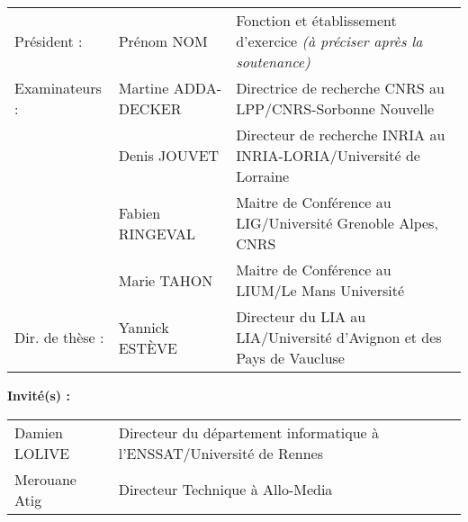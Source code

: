 {\begin{tabular}{@{}lll}
Pr\'{e}sident :        & Pr\'{e}nom NOM & Fonction et \'{e}tablissement d'exercice \textit{(à préciser après la soutenance)} \\
 Examinateurs :          & Martine ADDA-DECKER &Directrice de recherche CNRS au LPP/CNRS-Sorbonne Nouvelle \\
                         & Denis JOUVET &Directeur de recherche INRIA au INRIA-LORIA/Université de Lorraine \\
                         & Fabien RINGEVAL &Maitre de Conférence au LIG/Université Grenoble Alpes, CNRS \\
                         & Marie TAHON &Maitre de Conférence au LIUM/Le Mans Université \\
Dir. de th\`{e}se :    & Yannick ESTÈVE &Directeur du LIA au LIA/Université d'Avignon et des Pays de Vaucluse \\
\end{tabular}

\vspace{\baselineskip}
{\normalTwelve \textbf{Invit\'{e}(s) :}}\\ \newline
\footnotesizeTwelve
\begin{tabular}{@{}ll}
  Damien LOLIVE &Directeur du département informatique à l'ENSSAT/Université de Rennes \\
  Merouane Atig &Directeur Technique à Allo-Media \\
\end{tabular}
}


\maketitle
